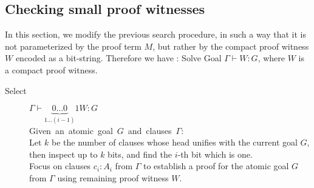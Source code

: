 \documentclass{llncs}
\newcommand{\figfoot}{\vspace{1ex}\hrule}
\newcommand{\fighead}{\hrule\vspace{1.5ex}}
\newcommand{\vd}{\vdash}
\begin{document}



\subsection{Checking small proof witnesses}
In this section, we modify the previous search procedure, in such a
way that it is not parameterized by the proof term $M$, but rather by
the compact proof witness $W$ encoded as a bit-string. Therefore we
have : Solve Goal $\Gamma \vd W : G$, where $W$ is a compact proof
witness.   

\begin{small}
\begin{description}
\item[Select] $\Gamma \vd \underset{1 \ldots
    (i-1)}{\underbrace{0\ldots 0}}1
W : G $ \\
    \mbox{Given an atomic goal $G$ and clauses $\Gamma$:}\hfill\\
    Let $k$ be the number of clauses whose head unifies with the
    current goal $G$, then inspect up to $k$ bits, and
    find the $i$-th bit which is one. \\ 
    Focus on clauses $c_i : A_i$ from $\Gamma$ to establish a proof
    for the atomic goal $G$ from $\Gamma$ using remaining proof witness $W$.
\end{description}
\end{small}    
\end{document}
